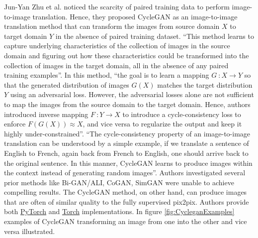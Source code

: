 Jun-Yan Zhu et al.\cite{zhu2020unpaired} noticed the scarcity of 	paired training data to perform image-to-image translation. Hence, they proposed \ac{CycleGAN} as an image-to-image translation method that can transform the images from source domain $X$ to target domain $Y$ in the absence of paired training dataset. ``This method learns to capture underlying characteristics of the collection of images in the source domain and figuring out how these characteristics could be transformed into the collection of images in the target domain, all in the absence of any paired training examples''\cite{zhu2020unpaired}. In this method, ``the goal is to learn a mapping $G\ \colon X \rightarrow Y$ so that the generated distribution of images $G(X)$ matches the target distribution $Y$ using an adversarial loss. However, the adversarial losses alone are not sufficient to map the images from the source domain to the target domain. Hence, authors introduced inverse mapping $F\ \colon Y \rightarrow X$ to introduce a cycle-consistency loss to enforce $F(G(X))\approx X$, and vice versa to regularize the output and keep it highly under-constrained''\cite{zhu2020unpaired}. ``The cycle-consistency property of an image-to-image translation can be understood by a simple example, if we translate a sentence of English to French, again back from French to English, one should arrive back to the original sentence. In this manner, \ac{CycleGAN} learns to produce images within the context instead of generating random images''\footnotemark. Authors investigated several prior methods like Bi-GAN/ALI\cite{donahue2017adversarial}\cite{dumoulin2017adversarially}, CoGAN\cite{liu2016coupled}, SimGAN\cite{shrivastava2017learning} were unable to achieve compelling results. The \ac{CycleGAN} method, on other hand, can produce images that are often of similar quality to the fully supervised pix2pix\cite{isola2018imagetoimage}. Authors provide both \href{https://github.com/junyanz/pytorch-CycleGAN-and-pix2pix}{PyTorch} and \href{https://github.com/junyanz/CycleGAN}{Torch} implementations. In figure \ref{fig:CycleganExamples} examples of \ac{CycleGAN} transforming an image from one into the other and vice versa illustrated.


